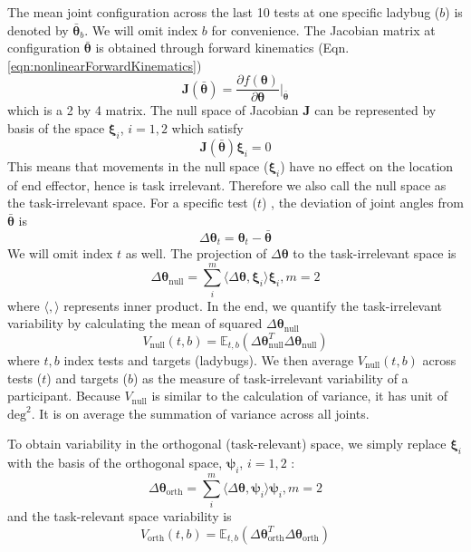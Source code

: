 The mean joint configuration across the last 10 tests at one specific ladybug ($ b $) is denoted by $ \bar{\bm{\theta}}_b $.
We will omit index $ b $ for convenience.
The Jacobian matrix at configuration $ \bar{\bm{\theta}} $ is obtained through forward kinematics (Eqn. \ref{eqn:nonlinearForwardKinematics})
	\begin{equation}
	\bm{J}(\bar{\bm{\theta}}) = \frac{\partial f(\bm{\theta})}{\partial \bm{\theta}} \Big\rvert_{\bar{\bm{\theta}}}
	\end{equation}
which is a 2 by 4 matrix.
The null space of Jacobian $ \bm{J} $ can be represented by basis of the space $ \bm{\xi}_i $, $ i= 1,2 $ which satisfy
	\begin{equation}
	\bm{J}(\bar{\bm{\theta}}) \bm{\xi}_i = 0
	\end{equation}
This means that movements in the null space ($ \bm{\xi}_i $) have no effect on the location of end effector, hence is task irrelevant.
Therefore we also call the null space as the task-irrelevant space.
For a specific test ($ t $) , the deviation of joint angles from $ \bar{\bm{\theta}} $ is
	\begin{equation}
	\Delta\bm{\theta}_t = \bm{\theta}_t - \bar{\bm{\theta}}
	\end{equation}
We will omit index $ t $ as well.
The projection of $ \Delta\bm{\theta} $ to the task-irrelevant space is
	\begin{equation}
	\Delta\bm{\theta}_{\text{null}} = \sum_i^m \langle \Delta\bm{\theta}, \bm{\xi}_i \rangle \bm{\xi}_i, m=2
	\end{equation}
where $ \langle,\rangle $ represents inner product.
In the end, we quantify the task-irrelevant variability by calculating the mean of squared $ \Delta\bm{\theta}_{\text{null}} $
	\begin{equation}\label{eqn:nullvar}
	V_{\text{null}}(t,b) = \mathbb{E}_{t,b} (\Delta\bm{\theta}_{\text{null}}^T\Delta\bm{\theta}_{\text{null}})
	\end{equation}
where $ t,b $ index tests and targets (ladybugs). 
We then average $ V_{\text{null}}(t,b) $ across tests ($ t $) and targets ($ b $) as the measure of task-irrelevant variability of a participant. 
Because $ V_{\text{null}} $ is similar to the calculation of variance, it has unit of $ \text{deg}^2 $.
It is on average the summation of variance across all joints.

To obtain variability in the orthogonal (task-relevant) space, we simply replace $ \bm{\xi}_i $ with the basis of the orthogonal space, $ \bm{\psi}_i $, $ i= 1,2 $  :
	\begin{equation}
	\Delta\bm{\theta}_{\text{orth}} = \sum_i^m \langle \Delta\bm{\theta}, \bm{\psi}_i \rangle \bm{\psi}_i, m=2
	\end{equation}
and the task-relevant space variability is
	\begin{equation}\label{eqn:taskvar}
	V_{\text{orth}}(t,b) = \mathbb{E}_{t,b} (\Delta\bm{\theta}_{\text{orth}}^T\Delta\bm{\theta}_{\text{orth}})
	\end{equation}

